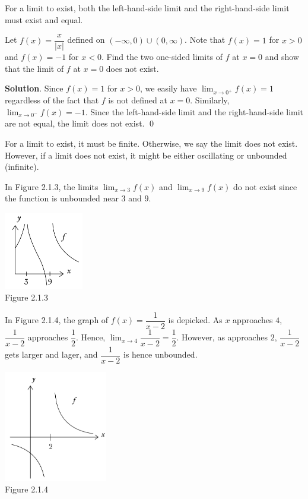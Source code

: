 \documentclass[11pt]{book}
\theoremstyle{break}
\theoremstyle{no_label}
\newcommand{\figtag}[1]{\\[-1.2em]Figure {#1}}
\numberwithin{equation}{section}
\begin{document}
For a limit to exist, both the left-hand-side limit and the right-hand-side limit must exist and equal.

\begin{example}
    Let $f(x)=\dfrac{x}{|x|}$ defined on $(-\infty, 0)\cup(0, \infty)$. Note that $f(x)=1$ for $x>0$ and $f(x)=-1$ for $x<0$. Find the two one-sided limits of $f$ at $x=0$ and show that the limit of $f$ at $x=0$ does not exist.
\end{example}
\textbf{Solution}. Since $f(x)=1$ for $x>0$, we easily have $\displaystyle\lim_{x\to 0^+}f(x)=1$ regardless of the fact that $f$ is not defined at $x=0$. Similarly, $\displaystyle\lim_{x\to 0^-}f(x)=-1$. Since the left-hand-side limit and the right-hand-side limit are not equal, the limit does not exist. \qed

\begin{remark}
    For a limit to exist, it must be finite. Otherwise, we say the limit does not exist. However, if a limit does not exist, it might be either oscillating or unbounded (infinite).
\end{remark}

\begin{example}
    In Figure 2.1.3, the limits $\displaystyle\lim_{x\to 3} f(x)$ and $\displaystyle\lim_{x\to 9} f(x)$ do not exist since the function is unbounded near $3$ and $9$.
\end{example}

\begin{center}
    \includegraphics[width=0.26\textwidth]{unbounded_limits.JPG}\figtag{2.1.3}
\end{center}

\begin{example}
    In Figure 2.1.4, the graph of $f(x)=\dfrac{1}{x-2}$ is depicked. As $x$ approaches $4$, $\dfrac{1}{x-2}$ approaches $\dfrac{1}{2}$. Hence, $\displaystyle\lim_{x\to 4}\dfrac{1}{x-2}=\dfrac{1}{2}$. However, as approaches $2$, $\dfrac{1}{x-2}$ gets larger and lager, and $\dfrac{1}{x-2}$ is hence unbounded.
\end{example}

\begin{center}
    \includegraphics[width=0.34\textwidth]{limit_reciprocal.JPG}\figtag{2.1.4}
\end{center}
\end{document}
